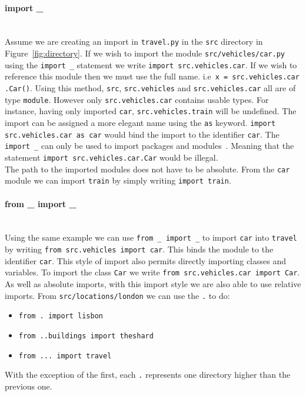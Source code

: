 \documentclass[12pt, titlepage]{article}
\begin{document}
\paragraph*{import \_} \mbox{} \\
Assume we are creating an import in \texttt{travel.py} in the \texttt{src} directory in Figure~\ref{fig:directory}. If we wish to import the module \texttt{src/vehicles/car.py} using the \texttt{import \_} statement we write \texttt{import src.vehicles.car}. If we wish to reference this module then we must use the full name. i.e\ \texttt{x = src.vehicles.car\\.Car()}. Using this method, \texttt{src}, \texttt{src.vehicles} and \texttt{src.vehicles.car} all are of type \texttt{module}. However only \texttt{src.vehicles.car} contains usable types. For instance, having only imported \texttt{car}, \texttt{src.vehicles.train} will be undefined. The import can be assigned a more elegant name using the \texttt{as} keyword. \texttt{import src.vehicles.car as car} would bind the import to the identifier \texttt{car}. The \texttt{import \_} can only be used to import packages and modules~\cite{VanRossumImports}. Meaning that the statement \texttt{import src.vehicles.car.Car} would be illegal. \\
\indent The path to the imported modules does not have to be absolute. From the \texttt{car} module we can import \texttt{train} by simply writing \texttt{import train}.

\paragraph*{from \_ import \_} \mbox{} \\
Using the same example we can use \texttt{from \_ import \_} to import \texttt{car} into \texttt{travel} by writing \texttt{from src.vehicles import car}. This binds the module to the identifier \texttt{car}. This style of import also permits directly importing classes and variables. To import the class \texttt{Car} we write \texttt{from src.vehicles.car import Car}. \\
\indent As well as absolute imports, with this import style we are also able to use relative imports. From \texttt{src/locations/london} we can use the \texttt{.} to do:
\begin{itemize}
	\item \texttt{from . import lisbon}
	\item \texttt{from ..buildings import theshard}
	\item \texttt{from ... import travel}
\end{itemize}
With the exception of the first, each \texttt{.} represents one directory higher than the previous one.
\end{document}
